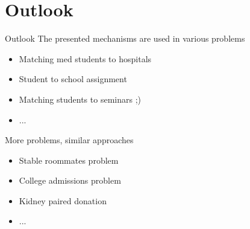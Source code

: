 \section{Outlook}

\begin{frame}{Outlook}
The presented mechanisms are used in various problems
    \begin{itemize}
        \item Matching med students to hospitals
        \item Student to school assignment
        \item Matching students to seminars ;)
        \item ...
    \end{itemize}
More problems, similar approaches
    \begin{itemize}
        \item Stable roommates problem 
        \item College admissions problem
        \item Kidney paired donation
        \item ...
    \end{itemize}
\end{frame}